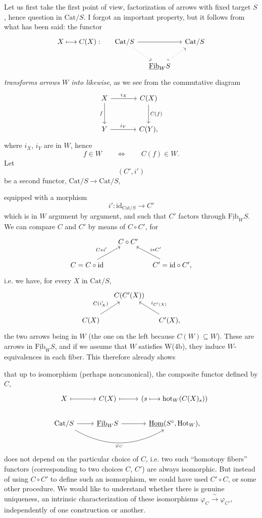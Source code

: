 \documentclass[11pt]{article}
\newcommand{\printedpage}[1]{\marginpar{\footnotesize p.~#1}}
\newcommand{\msp}[1]{\marginpar{\footnotesize [#1]}}
\newcommand{\Fib}{\underline{\mathrm{Fib}}}
\newcommand{\Hom}{\underline{\mathrm{Hom}}}
\newcommand{\Cat}{\mathrm{Cat}}
\begin{document}
Let us first take the first point of view, factorization of arrows with fixed target $S$, hence question in $\Cat/S$. I forgot an important property, but it follows from what has been said: the functor
\[
\begin{tikzcd}[column sep=small]
X \longmapsto C(X) : & \Cat/S \arrow[rr] \arrow[dr, dotted] & & \Cat/S \\
& & \Fib_W S \arrow[ur, dotted, hook] &
\end{tikzcd}
\]
\textit{transforms} \textit{arrows} \textit{$W$ into likewise}, as we see from the commutative diagram
\[
\begin{tikzcd}[row sep=large, column sep=large]
X \arrow[r, "i_X"] \arrow[d, "f"'] & C(X) \arrow[d, "C(f)"] \\
Y \arrow[r, "i_Y"] & C(Y),
\end{tikzcd}
\]
where $i_X$, $i_Y$ are in $W$, hence
\[
f \in W \qquad \Longleftrightarrow \qquad C(f) \in W.
\]
Let
\[
(C',i')
\]
be a second functor, $\Cat/S \longrightarrow \Cat/S$,

\msp{page 195}
equipped with a morphism
\[
i' : \mathrm{id}_{\Cat/S} \longrightarrow C'
\]
which is in $W$ argument by argument, and such that $C'$ factors through $\Fib_W S$. We can compare $C$ and $C'$ by means of $C \circ C'$, for
\[
\begin{tikzcd}[column sep=small]
& C \circ C' & \\
C = C \circ \mathrm{id} \arrow[ur, "C\ast i'"] & & C' = \mathrm{id} \circ C', \arrow[ul, "i\ast C'"']
\end{tikzcd}
\]
\printedpage{129}
i.e. we have, for every $X$ in $\Cat/S$,
\[
\begin{tikzcd}[column sep=small]
& C(C'(X)) & \\
C(X) \arrow[ur, "C(i'_X)"] & & C'(X), \arrow[ul, "i_{C'(X)}"']
\end{tikzcd}
\]
the two arrows being in $W$ (the one on the left because $C(W) \subseteq W$). These are arrows in $\Fib_W S$, and if we assume that $W$ satisfies W(4b), they induce $W$-equivalences in each fiber. This therefore already shows %

\msp{page 196}
that up to isomorphism (perhaps noncanonical), the composite functor defined by $C$,
\[
\begin{tikzcd}
X \arrow[r, mapsto] & C(X) \arrow[r, mapsto] & (s \longmapsto \mathrm{hot}_W(C(X)_s)) \\
\Cat/S \arrow[r] \arrow[rr, bend right, "\varphi_C"'] & \Fib_W S \arrow[r] & \Hom(S^\circ,\mathrm{Hot}_W),
\end{tikzcd}
\]
does not depend on the particular choice of $C$, i.e. two such ``homotopy fibers'' functors (corresponding to two choices $C$, $C'$) are always isomorphic. But instead of using $C \circ C'$ to define such an isomorphism, we could have used $C' \circ C$, or some other procedure. We would like to understand whether there is genuine uniqueness, an intrinsic characterization of these isomorphisms $\varphi_C \xrightarrow{\ \sim\ } \varphi_{C'}$, independently of one construction or another. %
\end{document}
